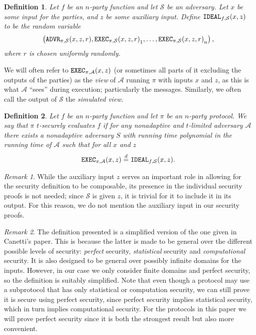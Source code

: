 \documentclass{article}
\newcommand\paper{paper}
\newcommand{\eqd}[0]{\stackrel{d}{=}}
\newtheorem{definition}{Definition}
\theoremstyle{remark}
\newtheorem{remark}{Remark}
\begin{document}
\begin{definition}
	Let $f$ be an $n$-party function and let $\mathcal{S}$ be an adversary. Let
	$x$ be some input for the parties, and $z$ be some auxiliary input. Define
	$\textup{\texttt{IDEAL}}_{f, \mathcal{S}} (x, z)$ to be the random variable
	\begin{align*}
		\left(
			\textup{\texttt{ADVR}}_{\pi, \mathcal{S}}(x, z, r),
			{\textup{\texttt{EXEC}}_{\pi, \mathcal{S}}(x, z, r)}_1,
			\ldots,
			{\textup{\texttt{EXEC}}_{\pi, \mathcal{S}}(x, z, r)}_n
		\right),
	\end{align*}
	where $r$ is chosen uniformly randomly.
\end{definition}

We will often refer to $\textup{\texttt{EXEC}}_{\pi, \mathcal{A}} (x, z)$ (or sometimes all parts
of it excluding the outputs of the parties) as the \textit{view} of
$\mathcal{A}$ running $\pi$ with inputs $x$ and $z$, as this is what
$\mathcal{A}$ ``sees'' during execution; particularly the messages. Similarly,
we often call the output of $\mathcal{S}$ the \textit{simulated view}.

\begin{definition}\label{def:sec}
	Let $f$ be an $n$-party function and let $\pi$ be an $n$-party protocol. We
	say that $\pi$ $t$-securely evaluates $f$ if for any nonadaptive and
	$t$-limited adversary $\mathcal{A}$ there exists a nonadaptive adversary
	$S$ with running time polynomial in the running time of $\mathcal{A}$ such
	that for all $x$ and $z$
	\begin{align*}
		\exec{\pi}{\mathcal{A}}{x}{z} \eqd \ideal{f}{\mathcal{S}}{x}{z}.
	\end{align*}
\end{definition}

\begin{remark}
	While the auxiliary input $z$ serves an important role in allowing for the
	security definition to be composable, its presence in the individual
	security proofs is not needed; since $\mathcal{S}$ is given $z$, it is
	trivial for it to include it in its output. For this reason, we do not
	mention the auxiliary input in our security proofs.
\end{remark}

\begin{remark}
	The definition presented is a simplified version of the one given in
	Canetti's paper. This is because the latter is made to be general over the
	different possible levels of security: \textit{perfect} security,
	\textit{statistical} security and \textit{computational} security. It is
	also designed to be general over possibly infinite domains for the inputs.
	However, in our case we only consider finite domains and perfect security,
	so the definition is suitably simplified. Note that even though a protocol
	may use a subprotocol that has only statistical or computation security, we
	can still prove it is secure using perfect security, since perfect security
	implies statistical security, which in turn implies computational security.
	For the protocols in this \paper{} we will prove perfect security since it
	is both the strongest result but also more convenient.
\end{remark}
\end{document}
